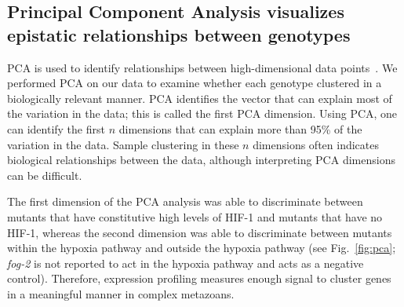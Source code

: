 \documentclass[9pt,twocolumn,twoside]{pnas-new}
\newcommand{\gene}[1]{\mbox{\emph{#1}}}
\newcommand{\fog}{\gene{fog-2(lf)}}
\newcommand{\egl}{\gene{egl-9(lf)}}
\newcommand{\rhy}{\gene{rhy-1(lf)}}
\newcommand{\vhl}{\gene{vhl-1(lf)}}
\newcommand{\eglvhl}{\gene{egl-9(lf);vhl-1(lf)}}
\newcommand{\eglhif}{\gene{egl-9(lf) hif-1(lf)}}
\newcommand{\hif}{\gene{hif-1(lf)}}
\newcommand{\hifp}{HIF-1}
\begin{document}
\subsection*{Principal Component Analysis visualizes epistatic relationships
             between genotypes}
\label{sub:Clustering}

PCA is used to identify relationships between high-dimensional data
points~\cite{Yeung2001}. We performed PCA on our data to examine whether each
genotype clustered in a biologically relevant manner. PCA identifies the vector
that can explain most of the variation in the data; this is called the first PCA
dimension. Using PCA, one can identify the first $n$ dimensions that can explain
more than 95\% of the variation in the data. Sample clustering in these $n$
dimensions often indicates biological relationships between the data, although
interpreting PCA dimensions can be difficult.


The first dimension of the PCA analysis was able to discriminate between mutants
that have constitutive high levels of \hifp{} and mutants that have no \hifp{},
whereas the second dimension was able to discriminate between mutants within the
hypoxia pathway and outside the hypoxia pathway (see Fig.~\ref{fig:pca};
\gene{fog-2} is not reported to act in the hypoxia pathway and acts as a
negative control). Therefore, expression profiling measures enough signal to
cluster genes in a meaningful manner in complex metazoans.
\end{document}
